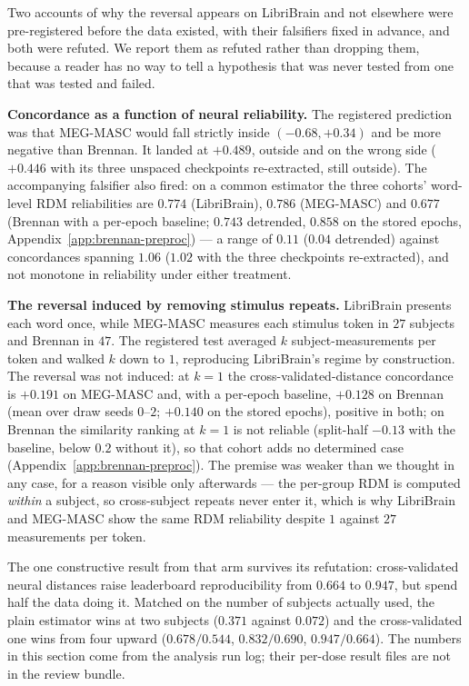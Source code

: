 \documentclass{article}
\begin{document}
Two accounts of why the reversal appears on LibriBrain and not elsewhere were pre-registered before
the data existed, with their falsifiers fixed in advance, and both were refuted. We report them as
refuted rather than dropping them, because a reader has no way to tell a hypothesis that was never
tested from one that was tested and failed.

\textbf{Concordance as a function of neural reliability.} The registered prediction was that
MEG-MASC would fall strictly inside $(-0.68, +0.34)$ and be more negative than Brennan. It landed at
$+0.489$, outside and on the wrong side ($+0.446$ with its three unspaced checkpoints re-extracted,
still outside). The accompanying falsifier also fired: on a common
estimator the three cohorts' word-level RDM reliabilities are $0.774$ (LibriBrain), $0.786$
(MEG-MASC) and $0.677$ (Brennan with a per-epoch baseline; $0.743$ detrended, $0.858$ on the stored
epochs, Appendix~\ref{app:brennan-preproc}) --- a range of $0.11$ ($0.04$ detrended) against
concordances spanning $1.06$ ($1.02$ with the three checkpoints re-extracted), and not
monotone in reliability under either treatment.

\textbf{The reversal induced by removing stimulus repeats.} LibriBrain presents each word once,
while MEG-MASC measures each stimulus token in $27$ subjects and Brennan in $47$. The registered
test averaged $k$ subject-measurements per token and walked $k$ down to $1$, reproducing LibriBrain's
regime by construction. The reversal was not induced: at $k = 1$ the cross-validated-distance
concordance is $+0.191$ on MEG-MASC and, with a per-epoch baseline, $+0.128$ on Brennan (mean over draw
seeds $0$--$2$; $+0.140$ on the stored epochs), positive in both; on Brennan the similarity ranking at
$k=1$ is not reliable (split-half $-0.13$ with the baseline, below $0.2$ without it), so that cohort adds
no determined case (Appendix~\ref{app:brennan-preproc}). The premise was weaker than we thought in any
case, for a reason visible only afterwards --- the per-group RDM is computed \emph{within} a
subject, so cross-subject repeats never enter it, which is why LibriBrain and MEG-MASC show the same
RDM reliability despite $1$ against $27$ measurements per token.

The one constructive result from that arm survives its refutation: cross-validated neural distances
raise leaderboard reproducibility from $0.664$ to $0.947$, but spend half the data doing it. Matched
on the number of subjects actually used, the plain estimator wins at two subjects ($0.371$ against
$0.072$) and the cross-validated one wins from four upward ($0.678/0.544$, $0.832/0.690$,
$0.947/0.664$). The numbers in this section come from the analysis run log; their per-dose result
files are not in the review bundle.
\end{document}
